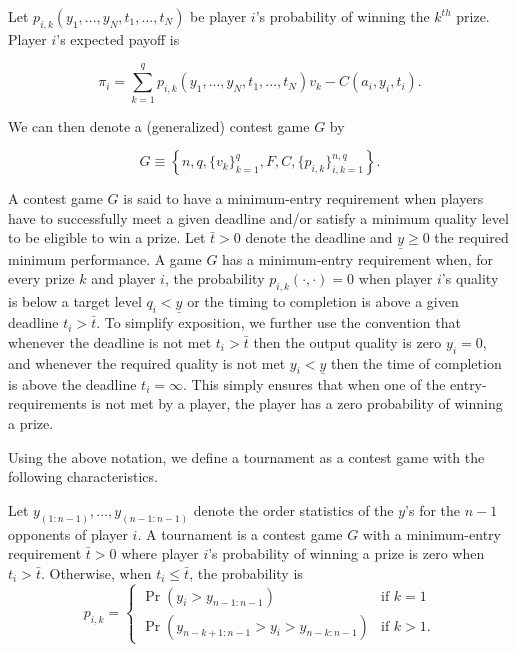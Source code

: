 \documentclass[12pt,]{article}
\theoremstyle{plain} %
\newcommand\deadline{\bar{t}}
\newcommand\target{\underline{y}}
\begin{document}
Let \(p_{i, k}(y_1,..., y_N, t_1, ..., t_N)\) be player \(i\)'s
probability of winning the \(k^{th}\) prize. Player \(i\)'s expected
payoff is

\begin{equation}
  \label{expected payoff}
  \pi_i = \sum_{k=1}^{q} p_{i, k}(y_1,..., y_N, t_1, ..., t_N) v_k - C(a_i, y_i, t_i). 
\end{equation}

We can then denote a (generalized) contest game \(G\) by

\begin{equation}
G \equiv \left\{
    n, q, \{v_k\}_{k=1}^{q},  F, C, \{p_{i,k}\}_{i,k=1}^{n,q} 
  \right\}.
\end{equation}

A contest game \(G\) is said to have a minimum-entry requirement when
players have to successfully meet a given deadline and/or satisfy a
minimum quality level to be eligible to win a prize. Let \(\deadline>0\)
denote the deadline and \(\target\geq 0\) the required minimum
performance. A game \(G\) has a minimum-entry requirement when, for
every prize \(k\) and player \(i\), the probability
\(p_{i, k}(\cdot, \cdot)=0\) when player \(i\)'s quality is below a
target level \(q_i < \target\) or the timing to completion is above a
given deadline \(t_i>\deadline\). To simplify exposition, we further use
the convention that whenever the deadline is not met \(t_i> \deadline\)
then the output quality is zero \(y_i=0\), and whenever the required
quality is not met \(y_i<\target\) then the time of completion is above
the deadline \(t_i = \infty\). This simply ensures that when one of the
entry-requirements is not met by a player, the player has a zero
probability of winning a prize.

Using the above notation, we define a tournament as a contest game with
the following characteristics.

\begin{definition}[Tournament] \label{tournament}
Let $y_{(1:n-1)}, ..., y_{(n-1:n-1)}$ denote the order statistics of the $y$'s for the $n-1$ opponents of player $i$. A tournament is a contest game $G$ with a minimum-entry requirement $\deadline>0$ where player $i$'s probability of winning a prize is zero when $t_i > \deadline$. Otherwise, when $t_i\leq\deadline$, the probability is 
\begin{equation}
  p_{i, k} =
  \begin{cases}
    \Pr(y_i > y_{n-1:n-1}) & \text{if }k=1\\
    \Pr(y_{n-k+1:n-1} > y_i > y_{n-k:n-1}) & \text{if }k>1.
  \end{cases}
\end{equation}
\end{definition}
\end{document}
